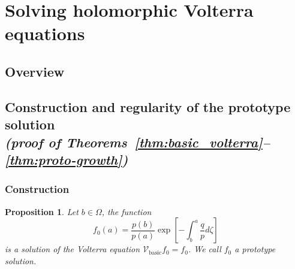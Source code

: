 \documentclass{article}
\theoremstyle{plain}
\newtheorem{prop}{Proposition}
\newcommand{\expHoloL}[2]{\mathcal{H}L^{#1}_{#2}} %
\newcommand{\hardpart}{\mathcal{V}_\text{basic}}
\begin{document}

\section{Solving holomorphic Volterra equations}
\subsection{Overview}
\subsection{Construction and regularity of the prototype solution \\ \textit{(proof of Theorems~\ref{thm:basic_volterra}--\ref{thm:proto-growth})}}\label{sec:proto-construction-regularity}

\subsubsection{Construction}\label{sec:construction}

\begin{prop}\label{prop:construction}
    Let $b\in\Omega$, the function 
    \begin{equation}%
    f_0(a)=\frac{p(b)}{p(a)} \exp\left[-\int_{b}^{a}\frac{q}{p} d\zeta\right]
   \end{equation}
is a solution of the Volterra equation $\hardpart f_0=f_0$. We call $f_0$ a prototype solution.  
\end{prop}
\end{document}
